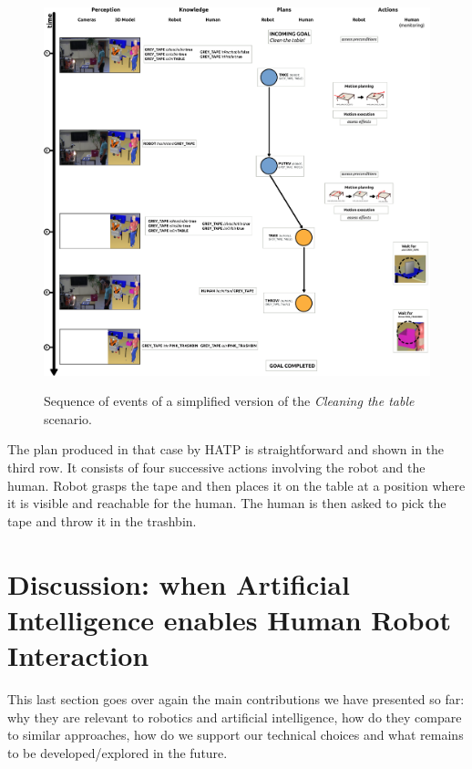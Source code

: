 \documentclass[preprint,3p,times]{elsarticle}
\begin{document}
\begin{figure}[thpb]
  \centering
    \includegraphics[width=1.0\textwidth]{manip_run.pdf} \\
        \caption {Sequence of events of a simplified version of the \emph{Cleaning the table} scenario.}
  \label{fig|cleantable-timeline}
\end{figure}


The plan produced in that case by HATP is straightforward and shown in the
third row. It consists of four successive actions involving the robot and the
human. Robot grasps the tape and then places it on the table at a position
where it is visible and reachable for the human. The human is then asked to pick
the tape and throw it in the trashbin.


\section{Discussion: when Artificial Intelligence enables Human Robot
Interaction}
\label{sect|conclusion}

This last section goes over again the main contributions we have presented
so far: why they are relevant to robotics and artificial intelligence, how do
they compare to similar approaches, how do we support our technical choices and
what remains to be developed/explored in the future.
\end{document}
